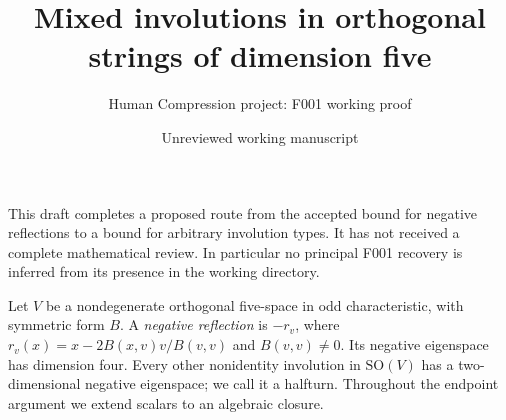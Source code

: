 \documentclass[11pt,a4paper]{article}
\title{Mixed involutions in orthogonal strings of dimension five}
\author{Human Compression project: F001 working proof}
\date{Unreviewed working manuscript}
\newcommand{\SO}{\mathrm{SO}}\newcommand{\F}{\mathbf F}
\begin{document}
\maketitle
This draft completes a proposed route from the accepted bound for negative
reflections to a bound for arbitrary involution types. It has not received
a complete mathematical review. In particular no principal F001 recovery
is inferred from its presence in the working directory.

Let $V$ be a nondegenerate orthogonal five-space in odd characteristic,
with symmetric form $B$. A \emph{negative reflection} is $-r_v$, where
$r_v(x)=x-2B(x,v)v/B(v,v)$ and $B(v,v)\ne0$. Its negative eigenspace
has dimension four. Every other nonidentity involution in $\SO(V)$
has a two-dimensional negative eigenspace; we call it a halfturn.
Throughout the endpoint argument we extend scalars to an algebraic closure.
\end{document}
